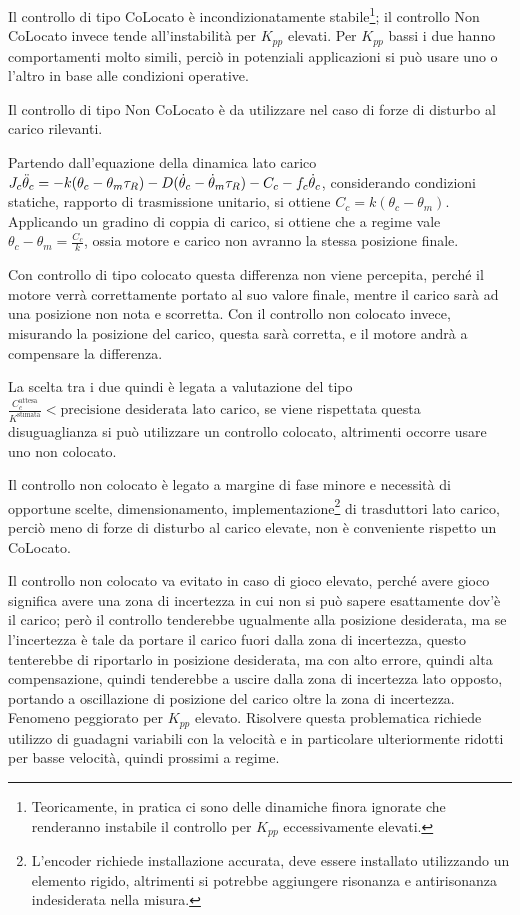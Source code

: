 
Il controllo di tipo CoLocato è incondizionatamente stabile\footnote{Teoricamente, in pratica ci sono delle dinamiche finora ignorate che renderanno instabile il controllo per \(K_{pp}\) eccessivamente elevati.}; il controllo Non CoLocato invece tende all'instabilità per \(K_{pp}\) elevati.
Per \(K_{pp}\) bassi i due hanno comportamenti molto simili, perciò in potenziali applicazioni si può usare uno o l'altro in base alle condizioni operative.

Il controllo di tipo Non CoLocato è da utilizzare nel caso di forze di disturbo al carico rilevanti. 

Partendo dall'equazione della dinamica lato carico \(J_c \Ddot{\theta}_c = -k(\theta_c - \theta_m \tau_R) - D(\dot{\theta}_c - \dot{\theta}_m\tau_R) - C_c - f_c\dot{\theta}_c\), considerando condizioni statiche, rapporto di trasmissione unitario, si ottiene \(C_c = k(\theta_c - \theta_m)\).
Applicando un gradino di coppia di carico, si ottiene che a regime vale \(\theta_c - \theta_m = \frac{C_c}{k}\), ossia motore e carico non avranno la stessa posizione finale.

Con controllo di tipo colocato questa differenza non viene percepita, perché il motore verrà correttamente portato al suo valore finale, mentre il carico sarà ad una posizione non nota e scorretta.
Con il controllo non colocato invece, misurando la posizione del carico, questa sarà corretta, e il motore andrà a compensare la differenza.

La scelta tra i due quindi è legata a valutazione del tipo \(\frac{C_c^\text{attesa}}{K^\text{stimata}} < \text{precisione desiderata lato carico}\), se viene rispettata questa disuguaglianza si può utilizzare un controllo colocato, altrimenti occorre usare uno non colocato.

Il controllo non colocato è legato a margine di fase minore e necessità di opportune scelte, dimensionamento, implementazione\footnote{L'encoder richiede installazione accurata, deve essere installato utilizzando un elemento rigido, altrimenti si potrebbe aggiungere risonanza e antirisonanza indesiderata nella misura.} di trasduttori lato carico, perciò meno di forze di disturbo al carico elevate, non è conveniente rispetto un CoLocato.

Il controllo non colocato va evitato in caso di gioco elevato, perché avere gioco significa avere una zona di incertezza in cui non si può sapere esattamente dov'è il carico; però il controllo tenderebbe ugualmente alla posizione desiderata, ma se l'incertezza è tale da portare il carico fuori dalla zona di incertezza, questo tenterebbe di riportarlo in posizione desiderata, ma con alto errore, quindi alta compensazione, quindi tenderebbe a uscire dalla zona di incertezza lato opposto, portando a oscillazione di posizione del carico oltre la zona di incertezza. Fenomeno peggiorato per \(K_{pp}\) elevato.
Risolvere questa problematica richiede utilizzo di guadagni variabili con la velocità e in particolare ulteriormente ridotti per basse velocità, quindi prossimi a regime.